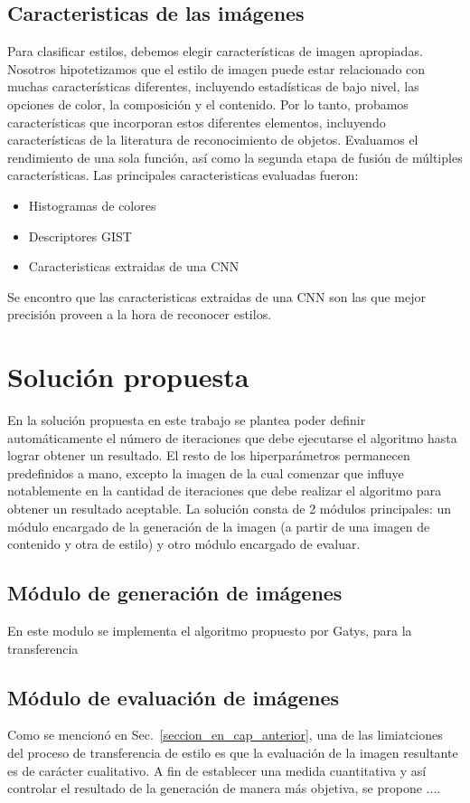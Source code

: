 \documentclass[a4paper,11pt,spanish]{book}
\begin{document}
    \subsection{Caracteristicas de las imágenes}
	Para clasificar estilos, debemos elegir características de imagen apropiadas. Nosotros hipotetizamos que el estilo de imagen puede estar relacionado con muchas características diferentes,
	incluyendo estadísticas de bajo nivel, las opciones de color, la composición y el contenido. Por lo tanto, probamos características que incorporan estos diferentes elementos, incluyendo características de la
	literatura de reconocimiento de objetos. Evaluamos el rendimiento de una sola función, así como la segunda etapa de fusión de múltiples características.
	Las principales caracteristicas evaluadas fueron:
	\begin{itemize}
	 \item Histogramas de colores
	 \item Descriptores GIST
	 \item Caracteristicas extraidas de una CNN
	\end{itemize}
	Se encontro que las caracteristicas extraidas de una CNN son las que mejor precisión proveen a la hora de reconocer estilos.
\fi
  \section{Solución propuesta\label{sec:solucion}}
    En la solución propuesta en este trabajo se plantea poder definir automáticamente el número de iteraciones que debe ejecutarse el algoritmo hasta lograr obtener un resultado.
    El resto de los hiperparámetros permanecen predefinidos a mano, excepto la imagen de la cual comenzar que influye notablemente en la cantidad de iteraciones que debe realizar el
    algoritmo para obtener un resultado aceptable.
    La solución consta de 2 módulos principales: un módulo encargado de la generación de la imagen (a partir de una imagen de contenido y otra de estilo) y otro módulo encargado de
    evaluar.
    \subsection{Módulo de generación de imágenes}
      En este modulo se implementa el algoritmo propuesto por Gatys, para la transferencia
    \subsection{Módulo de evaluación de imágenes}
      Como se mencionó en Sec.~\ref{seccion_en_cap_anterior}, una de las
      limiatciones del proceso de transferencia de estilo es que la evaluación de
      la imagen resultante es de carácter cualitativo. A fin de establecer una
      medida cuantitativa y así controlar el resultado de la generación de
      manera más objetiva, se
      propone ....
\end{document}
